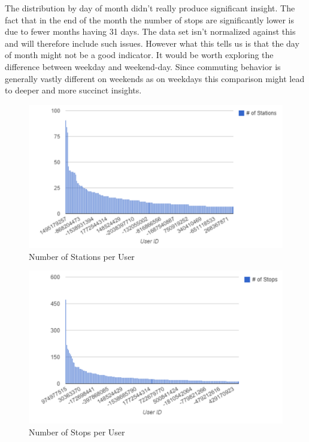 The distribution by day of month didn't really produce significant insight. The fact that in the end of the month the number of stops are significantly lower is due to fewer months having 31 days. The data set isn't normalized against this and will therefore include such issues. However what this tells us is that the day of month might not be a good indicator. It would be worth exploring the difference between weekday and weekend-day. Since commuting behavior is generally vastly different on weekends as on weekdays this comparison might lead to deeper and more succinct insights.

\begin{figure}[!ht]
	\caption{Number of Stations per User}
	\centering
	\includegraphics[width=1.0\textwidth]{charts/different_stations_per_user}
\end{figure}


\begin{figure}[!ht]
	\caption{Number of Stops per User}
	\centering
	\includegraphics[width=1.0\textwidth]{charts/stops_per_user}
\end{figure}

